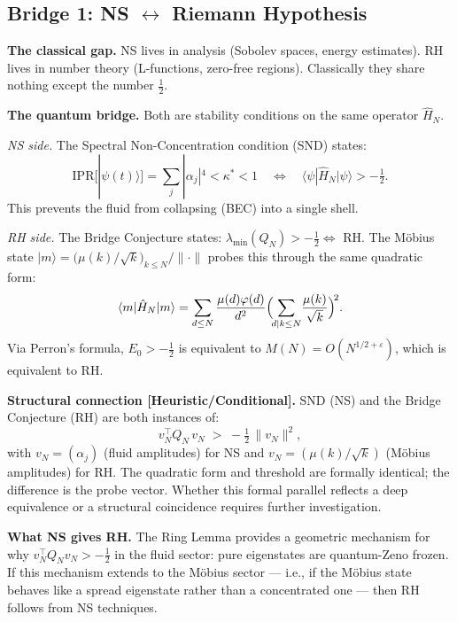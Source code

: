 \documentclass[12pt]{article}
\newcommand{\ket}[1]{|{#1}\rangle}
\newcommand{\bra}[1]{\langle{#1}|}
\newcommand{\half}{\tfrac{1}{2}}
\begin{document}
\subsection{Bridge 1: NS $\longleftrightarrow$ Riemann Hypothesis}
\label{sec:bridge-rh}

\textbf{The classical gap.}
NS lives in analysis (Sobolev spaces, energy estimates).
RH lives in number theory (L-functions, zero-free regions).
Classically they share nothing except the number $\half$.

\textbf{The quantum bridge.}
Both are stability conditions on the same operator $\hat{H}_N$.

\medskip
\noindent\textit{NS side.}
The Spectral Non-Concentration condition (SND) states:
\[
  \mathrm{IPR}[\ket{\psi(t)}] = \sum_j|\alpha_j|^4 < \kappa^* < 1
  \quad\Longleftrightarrow\quad
  \bra{\psi}\hat{H}_N\ket{\psi} > -\half.
\]
This prevents the fluid from collapsing (BEC) into a single shell.

\noindent\textit{RH side.}
The Bridge Conjecture states: $\lambda_{\min}(Q_N) > -\half \Leftrightarrow$ RH.
The M\"{o}bius state
$\ket{m} = \bigl(\mu(k)/\sqrt{k}\bigr)_{k\le N}/\|\cdot\|$
probes this through the same quadratic form:
\[
  \bra{m}\hat{H}_N\ket{m}
  = \sum_{d\le N}\frac{\mu(d)\varphi(d)}{d^2}
    \Bigl(\!\sum_{d|k\le N}\!\frac{\mu(k)}{\sqrt{k}}\Bigr)^{\!2}.
\]
Via Perron's formula, $E_0 > -\half$ is equivalent to
$M(N) = O(N^{1/2+\varepsilon})$, which is equivalent to RH.

\begin{tcolorbox}[keybox]
\textbf{Structural connection [Heuristic/Conditional].}
SND (NS) and the Bridge Conjecture (RH) are both instances of:
\[
  v_N^\top Q_N\, v_N \;>\; -\tfrac{1}{2}\,\|v_N\|^2,
\]
with $v_N = (\alpha_j)$ (fluid amplitudes) for NS
and $v_N = (\mu(k)/\sqrt{k})$ (M\"{o}bius amplitudes) for RH.
The quadratic form and threshold are formally identical;
the difference is the probe vector.
Whether this formal parallel reflects a deep equivalence
or a structural coincidence requires further investigation.
\end{tcolorbox}

\textbf{What NS gives RH.}
The Ring Lemma provides a geometric mechanism for why
$v_N^\top Q_N v_N > -\half$ in the fluid sector:
pure eigenstates are quantum-Zeno frozen.
If this mechanism extends to the M\"{o}bius sector ---
i.e., if the M\"{o}bius state behaves like a spread eigenstate
rather than a concentrated one ---
then RH follows from NS techniques.
\end{document}
